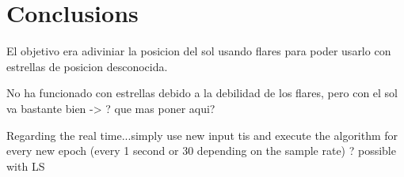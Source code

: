 \chapter{Conclusions}

El objetivo era adiviniar la posicion del sol usando flares para poder usarlo con estrellas de posicion desconocida.

No ha funcionado con estrellas debido a la debilidad de los flares, pero con el sol va bastante bien -> ? que mas poner aqui?

Regarding the real time...simply use new input tis and execute the algorithm for every new epoch (every 1 second or 30 depending on the sample rate) ? possible with LS
